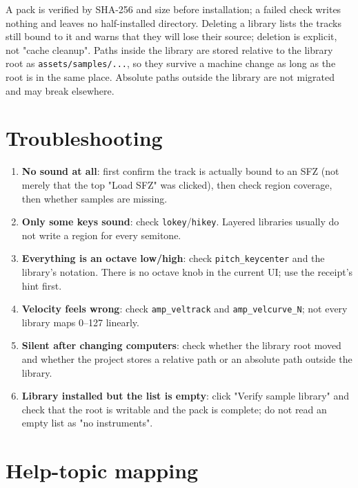 A pack is verified by SHA-256 and size before installation; a failed check writes nothing and leaves no half-installed directory. Deleting a library lists the tracks still bound to it and warns that they will lose their source; deletion is explicit, not "cache cleanup". Paths inside the library are stored relative to the library root as \texttt{assets/samples/...}, so they survive a machine change as long as the root is in the same place. Absolute paths outside the library are not migrated and may break elsewhere.


\section{Troubleshooting}

\begin{enumerate}
  \item \textbf{No sound at all}: first confirm the track is actually bound to an SFZ (not merely that the top "Load SFZ" was clicked), then check region coverage, then whether samples are missing.
  \item \textbf{Only some keys sound}: check \texttt{lokey}/\texttt{hikey}. Layered libraries usually do not write a region for every semitone.
  \item \textbf{Everything is an octave low/high}: check \texttt{pitch\_keycenter} and the library's notation. There is no octave knob in the current UI; use the receipt's hint first.
  \item \textbf{Velocity feels wrong}: check \texttt{amp\_veltrack} and \texttt{amp\_velcurve\_N}; not every library maps 0–127 linearly.
  \item \textbf{Silent after changing computers}: check whether the library root moved and whether the project stores a relative path or an absolute path outside the library.
  \item \textbf{Library installed but the list is empty}: click "Verify sample library" and check that the root is writable and the pack is complete; do not read an empty list as "no instruments".
\end{enumerate}

\section{Help-topic mapping}

